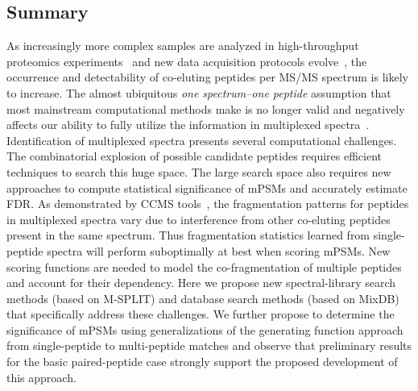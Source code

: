 \documentclass[arial,11pt]{article}
\begin{document}
\subsection{Summary}
As increasingly more complex samples are analyzed in high-throughput proteomics experiments~\cite{pr101060v} and new data acquisition protocols evolve~\cite{venable2004aaq,masselon2003itp,chakraborty2007uim,Michalski2011QExactive}, the occurrence and detectability of co-eluting peptides per MS/MS spectrum is likely to increase. The almost ubiquitous \emph{one spectrum--one peptide} assumption that most mainstream computational methods make is no longer valid and negatively affects our ability to fully utilize the information in multiplexed spectra~\cite{houel2010quantifying}.
Identification of multiplexed spectra presents several computational challenges.  The combinatorial explosion of possible candidate peptides requires efficient techniques to search this huge space.  The large search space also requires new approaches to compute statistical significance of mPSMs and accurately estimate FDR.
As demonstrated by CCMS tools~\cite{wang2010msplit}, the fragmentation patterns for peptides in multiplexed spectra vary due to interference from other co-eluting peptides present in the same spectrum.  Thus fragmentation statistics learned from single-peptide spectra will perform suboptimally at best when scoring mPSMs. New scoring functions are needed to model the co-fragmentation of multiple peptides and account for their dependency.  Here we propose new spectral-library search methods (based on M-SPLIT) and database search methods (based on MixDB) that specifically address these challenges. We further propose to determine the significance of mPSMs using generalizations of the generating function approach~\cite{kim2008spectral} from single-peptide to multi-peptide matches and observe that preliminary results for the basic paired-peptide case strongly support the proposed development of this approach.
\end{document}
